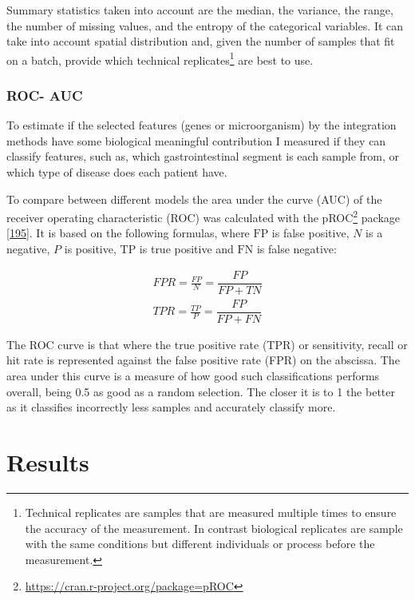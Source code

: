 \documentclass[
  12pt,
  a4paper,
  twoside,
  openright]{book}
\DeclareRobustCommand{\href}[2]{#2\footnote{\url{#1}}}
\begin{document}
Summary statistics taken into account are the median, the variance, the range, the number of missing values, and the entropy of the categorical variables.
It can take into account spatial distribution and, given the number of samples that fit on a batch, provide which technical replicates\footnote{Technical replicates are samples that are measured multiple times to ensure the accuracy of the measurement.
  In contrast biological replicates are sample with the same conditions but different individuals or process before the measurement.} are best to use.

\hypertarget{ROC}{%
\subsection{ROC- AUC}\label{ROC}}

To estimate if the selected features (genes or microorganism) by the integration methods have some biological meaningful contribution I measured if they can classify features, such as, which gastrointestinal segment is each sample from, or which type of disease does each patient have.

To compare between different models the area under the curve (AUC) of the receiver operating characteristic (ROC) was calculated with the \href{https://cran.r-project.org/package=pROC}{pROC} package {[}\protect\hyperlink{ref-robin2011}{195}{]}.
It is based on the following formulas, where \(\text{FP}\) is false positive, \(N\) is a negative, \(P\) is positive, \(\text{TP}\) is true positive and \(\text{FN}\) is false negative:

\[
\begin{aligned}
FPR = \frac{FP}{N} = \dfrac{FP}{FP+TN} \\
TPR = \frac{TP}{P} = \dfrac{FP}{FP+FN} 
\end{aligned}
\]

The ROC curve is that where the true positive rate (TPR) or sensitivity, recall or hit rate is represented against the false positive rate (FPR) on the abscissa.
The area under this curve is a measure of how good such classifications performs overall, being 0.5 as good as a random selection.
The closer it is to 1 the better as it classifies incorrectly less samples and accurately classify more.

\hypertarget{results}{%
\chapter{Results}\label{results}}
\end{document}
